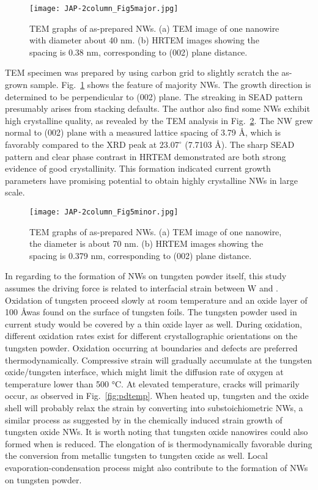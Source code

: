 \begin{figure}[htb]
\centering
\texttt{[image: JAP-2column\_Fig5major.jpg]}
\caption[Characterization of : TEM]{TEM graphs of as-prepared NWs. (a) TEM image of one nanowire with diameter about 40 nm. (b) HRTEM images showing the spacing is 0.38 nm, corresponding to (002) plane distance.}
\label{fig:woseedtem1}
\end{figure}

TEM specimen was prepared by using carbon grid to slightly scratch the as-grown sample. Fig.~\ref{fig:woseedtem1} shows the feature of majority NWs. The growth direction is determined to be perpendicular to (002) plane. The streaking in SEAD pattern presumably arises from stacking defaults. The author also find some NWs exhibit high crystalline quality, as revealed by the TEM analysis in Fig.~\ref{fig:woseedtem2}. The NW grew normal to (002) plane with a measured lattice spacing of 3.79 \AA, which is favorably compared to the XRD peak at $23.07^\circ$ (7.7103 \AA). The sharp SEAD pattern and clear phase contrast in HRTEM demonstrated are both strong evidence of good crystallinity. This formation indicated current growth parameters have promising potential to obtain highly crystalline  NWs in large scale. 

\begin{figure}[htb]
\centering
\texttt{[image: JAP-2column\_Fig5minor.jpg]}
\caption[Characterization of : TEM cont]{TEM graphs of as-prepared NWs. (a) TEM image of one nanowire, the diameter is about 70 nm. (b) HRTEM images showing the spacing is 0.379 nm, corresponding to (002) plane distance.}
\label{fig:woseedtem2}
\end{figure}

In regarding to the formation of NWs on tungsten powder itself, this study assumes the driving force is related to interfacial strain between W and . Oxidation of tungsten proceed slowly at room temperature and an oxide layer of 100 \AA was found on the surface of tungsten foils.\cite{Warren1996} The tungsten powder used in current study would be covered by a thin oxide layer as well. During oxidation, different oxidation rates exist for different crystallographic orientations on the tungsten powder. Oxidation occurring at boundaries and defects are preferred thermodynamically.\cite{You2010} Compressive strain will gradually accumulate at the tungsten oxide/tungsten interface, which might limit the diffusion rate of oxygen at temperature lower than 500 \si{\degreeCelsius}.\cite{tungsten1999} At elevated temperature, cracks will primarily occur, as observed in Fig.~\ref{fig:pdtemp}. When heated up, tungsten and the oxide shell will probably relax the strain by converting into substoichiometric NWs, a similar process as suggested by \citeauthor{Klinke2005} in the chemically induced strain growth of tungsten oxide NWs.\cite{Klinke2005} It is worth noting that tungsten oxide nanowires could also formed when  is reduced.\cite{Sarin1975} The elongation of  is thermodynamically favorable during the conversion from metallic tungsten to tungsten oxide as well. Local evaporation-condensation process might also contribute to the formation of NWs on tungsten powder.

